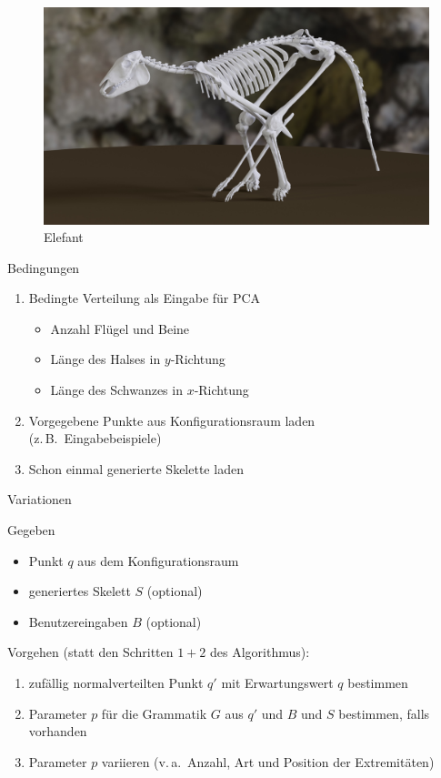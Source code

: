 \documentclass{beamer}
\newcommand{\zb}{z.\,B.\ }
\newcommand{\va}{v.\,a.\ }
\begin{document}
\begin{frame}[focus]
 \begin{figure}
  \includegraphics[width=\textwidth]{../../java_skeleton_generation/example_skeletons/elefant.jpg}
  \caption{Elefant}
 \end{figure}
\end{frame}

\begin{frame}{Bedingungen}
 \begin{enumerate}
  \item Bedingte Verteilung als Eingabe für PCA
  \begin{itemize}
   \item Anzahl Flügel und Beine
   \item Länge des Halses in $y$-Richtung
   \item Länge des Schwanzes in $x$-Richtung
  \end{itemize}
  \item Vorgegebene Punkte aus Konfigurationsraum laden\\ (\zb Eingabebeispiele)
  \item Schon einmal generierte Skelette laden
 \end{enumerate}
\end{frame}

\begin{frame}{Variationen}
 \begin{block}{Gegeben}
  \begin{itemize}
   \item Punkt $q$ aus dem Konfigurationsraum
   \item generiertes Skelett $S$ (optional)
   \item Benutzereingaben $B$ (optional)
  \end{itemize}
 \end{block}
 
 Vorgehen (statt den Schritten $1+2$ des Algorithmus):
 \begin{enumerate}
  \item zufällig normalverteilten Punkt $q'$ mit Erwartungswert $q$ bestimmen
  \item Parameter $p$ für die Grammatik $G$ aus $q'$ und $B$ und $S$ bestimmen, falls vorhanden
  \item Parameter $p$ variieren (\va Anzahl, Art und Position der Extremitäten)
 \end{enumerate}
\end{frame}
\end{document}

